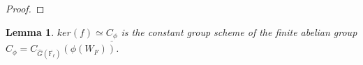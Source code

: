 \documentclass{article}
\newtheorem{lemma}{Lemma}
\begin{document}
\begin{proof}
		
	\end{proof}
	
	\begin{lemma}
		$ker(f) \simeq \underline{C_{\phi}}$ is the constant group scheme of the finite abelian group $C_{\phi}=C_{\hat{G}(\overline{\mathbb{F}_{\ell}})}(\phi(W_F))$.
	\end{lemma}
	
\end{document}
